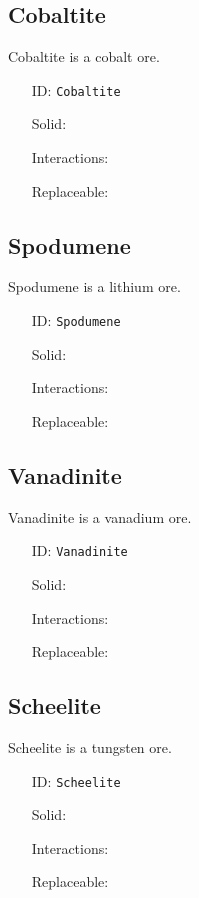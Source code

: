 \subsection{Cobaltite}\label{subsec:blocks_cobaltite}
Cobaltite is a cobalt ore.
\newline
\begin{itemize}[nosep]
\item[ID:] \texttt{Cobaltite}
\item[Solid:]  \Checkmark \item[Interactions:]  \XSolidBrush \item[Replaceable:]  \XSolidBrush \end{itemize}

\subsection{Spodumene}\label{subsec:blocks_spodumene}
Spodumene is a lithium ore.
\newline
\begin{itemize}[nosep]
\item[ID:] \texttt{Spodumene}
\item[Solid:]  \Checkmark \item[Interactions:]  \XSolidBrush \item[Replaceable:]  \XSolidBrush \end{itemize}

\subsection{Vanadinite}\label{subsec:blocks_vanadinite}
Vanadinite is a vanadium ore.
\newline
\begin{itemize}[nosep]
\item[ID:] \texttt{Vanadinite}
\item[Solid:]  \Checkmark \item[Interactions:]  \XSolidBrush \item[Replaceable:]  \XSolidBrush \end{itemize}

\subsection{Scheelite}\label{subsec:blocks_scheelite}
Scheelite is a tungsten ore.
\newline
\begin{itemize}[nosep]
\item[ID:] \texttt{Scheelite}
\item[Solid:]  \Checkmark \item[Interactions:]  \XSolidBrush \item[Replaceable:]  \XSolidBrush \end{itemize}


